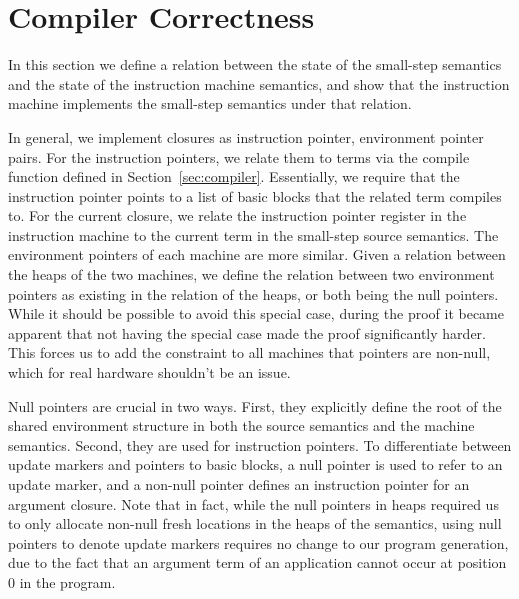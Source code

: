 \section{Compiler Correctness} \label{sec:correctness}

In this section we define a relation between the state of the small-step
semantics and the state of the instruction machine semantics, and show that the
instruction machine implements the small-step semantics under that relation. 

In general, we implement closures as instruction pointer, environment pointer
pairs. For the instruction pointers, we relate them to terms via the compile
function defined in Section~\ref{sec:compiler}. Essentially, we require that the
instruction pointer points to a list of basic blocks that the related term
compiles to. For the current closure, we relate the instruction pointer register
in the instruction machine to the current term in the small-step source
semantics. The environment pointers of each machine are more similar. Given a
relation between the heaps of the two machines, we define the relation between
two environment pointers as existing in the relation of the heaps, or both being
the null pointers. While it should be possible to avoid this special case,
during the proof it became apparent that not having the special case made the
proof significantly harder. This forces us to add the constraint to all machines
that pointers are non-null, which for real hardware shouldn't be an issue.  

Null pointers are crucial in two ways. First, they explicitly define the root
of the shared environment structure in both the source semantics and the machine
semantics. Second, they are used for instruction pointers. To differentiate
between update markers and pointers to basic blocks, a null pointer is used to
refer to an update marker, and a non-null pointer defines an instruction pointer
for an argument closure. Note that in fact, while the null pointers in heaps
required us to only allocate non-null fresh locations in the heaps of the \ce
semantics, using null pointers to denote update markers requires no change to
our program generation, due to the fact that an argument term of an
application cannot occur at position 0 in the program.

